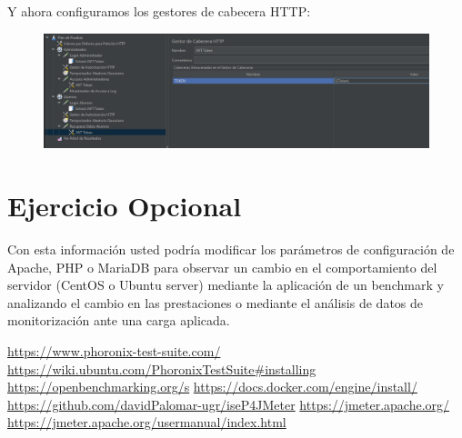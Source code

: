 \documentclass[a4paper]{article}
\begin{document}
\newline Y ahora configuramos los gestores de cabecera HTTP:
\newpage
\begin{figure}[hbt!]
    \centering
    \includegraphics[width=\textwidth]{gestor cabecera config.png}
\end{figure}
\section{Ejercicio Opcional}
Con esta información usted podría modificar los parámetros
de configuración de Apache, PHP o MariaDB para observar un cambio en el
comportamiento del servidor (CentOS o Ubuntu server) mediante la aplicación
de un benchmark y analizando el cambio en las prestaciones o mediante el análisis
de datos de monitorización ante una carga aplicada.
\newpage
\begin{thebibliography}{99}
    \href{https://www.phoronix-test-suite.com/}{https://www.phoronix-test-suite.com/}
    \href{https://wiki.ubuntu.com/PhoronixTestSuite#installing}{https://wiki.ubuntu.com/PhoronixTestSuite\#installing}
    \href{https://openbenchmarking.org/s}{https://openbenchmarking.org/s}
    \href{https://docs.docker.com/engine/install/}{https://docs.docker.com/engine/install/}
    \href{https://github.com/davidPalomar-ugr/iseP4JMeter}{https://github.com/davidPalomar-ugr/iseP4JMeter}
    \href{https://jmeter.apache.org/}{https://jmeter.apache.org/}
    \href{https://jmeter.apache.org/usermanual/index.html}{https://jmeter.apache.org/usermanual/index.html}

\end{thebibliography}
\end{document}
